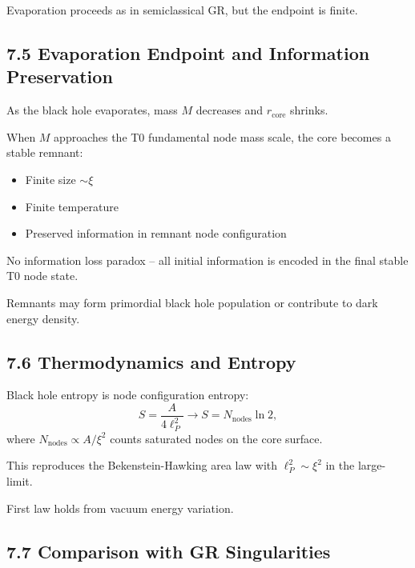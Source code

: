 	Evaporation proceeds as in semiclassical GR, but the endpoint is finite.
	
	\subsection{7.5 Evaporation Endpoint and Information Preservation}
	
	As the black hole evaporates, mass $M$ decreases and $r_{\text{core}}$ shrinks.
	
	When $M$ approaches the T0 fundamental node mass scale, the core becomes a stable remnant:
	\begin{itemize}
		\item Finite size $\sim \xi$
		\item Finite temperature
		\item Preserved information in remnant node configuration
	\end{itemize}
	
	No information loss paradox – all initial information is encoded in the final stable T0 node state.
	
	Remnants may form primordial black hole population or contribute to dark energy density.
	
	\subsection{7.6 Thermodynamics and Entropy}
	
	Black hole entropy is node configuration entropy:
	\[
	S = \frac{A}{4 \ell_P^2} \to S = N_{\text{nodes}} \ln 2,
	\]
	where $N_{\text{nodes}} \propto A / \xi^2$ counts saturated nodes on the core surface.
	
	This reproduces the Bekenstein-Hawking area law with $\ell_P^2 \sim \xi^2$ in the large-limit.
	
	First law holds from vacuum energy variation.
	
	\subsection{7.7 Comparison with GR Singularities}
	
